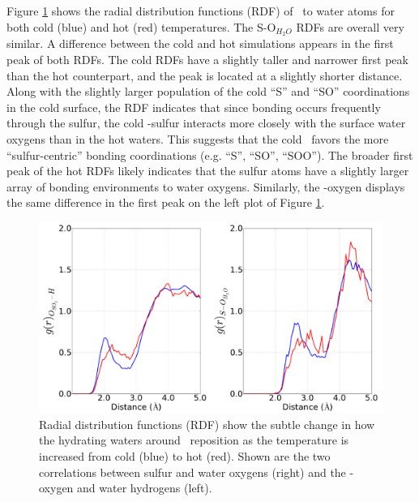 \documentclass{article}
\begin{document}

Figure \ref{fig:rdf} shows the radial distribution functions (RDF) of \suldiox~to water atoms for both cold (blue) and hot (red) temperatures. The S-O$_{H_2O}$ RDFs are overall very similar. A difference between the cold and hot simulations appears in the first peak of both RDFs. The cold RDFs have a slightly taller and narrower first peak than the hot counterpart, and the peak is located at a slightly shorter distance. Along with the slightly larger population of the cold ``S'' and ``SO'' coordinations in the cold surface, the RDF indicates that since bonding occurs frequently through the sulfur, the cold \suldiox-sulfur interacts more closely with the surface water oxygens than in the hot waters. This suggests that the cold \suldiox~favors the more ``sulfur-centric'' bonding coordinations (e.g. ``S'', ``SO'', ``SOO''). The broader first peak of the hot RDFs likely indicates that the sulfur atoms have a slightly larger array of bonding environments to water oxygens. Similarly, the \suldiox-oxygen displays the same difference in the first peak on the left plot of Figure \ref{fig:rdf}. 

\begin{figure}[h!]
	\begin{center}
		\includegraphics[scale=1.0]{rdf-small.png}
		\caption{Radial distribution functions (RDF) show the subtle change in how the hydrating waters around \suldiox~reposition as the temperature is increased from cold (blue) to hot (red). Shown are the two correlations between sulfur and water oxygens (right) and the \suldiox-oxygen and water hydrogens (left).}
		\label{fig:rdf}
	\end{center}
\end{figure}
\end{document}
